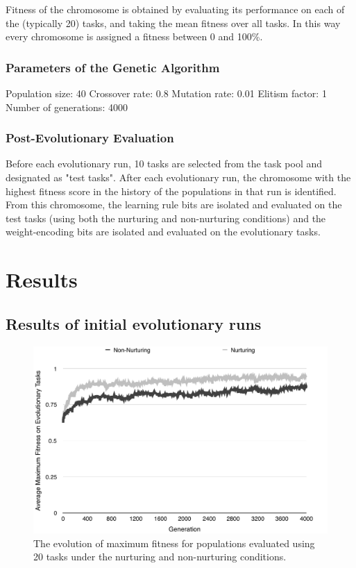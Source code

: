 \documentclass[master]{outhesis}
\begin{document}
Fitness of the chromosome is obtained by evaluating its performance on each of the (typically 20) tasks, and taking the mean fitness over all tasks. In this way every chromosome is assigned a fitness between 0 and 100\%.

\subsection{Parameters of the Genetic Algorithm}


Population size: 40
Crossover rate: 0.8
Mutation rate: 0.01
Elitism factor: 1
Number of generations: 4000

\subsection{Post-Evolutionary Evaluation}

Before each evolutionary run, 10 tasks are selected from the task pool and designated as "test tasks". After each evolutionary run, the chromosome with the highest fitness score in the history of the populations in that run is identified. From this chromosome, the learning rule bits are isolated and evaluated on the test tasks (using both the nurturing and non-nurturing conditions) and the weight-encoding bits are isolated and evaluated on the evolutionary tasks.

\chapter{Results}

\section{Results of initial evolutionary runs}

\begin{figure}[H]
	\centering
	\includegraphics{ChalmersEvolution.pdf}
	\caption{The evolution of maximum fitness for populations evaluated using 20 tasks under the nurturing and non-nurturing conditions.}
\end{figure}
\end{document}
